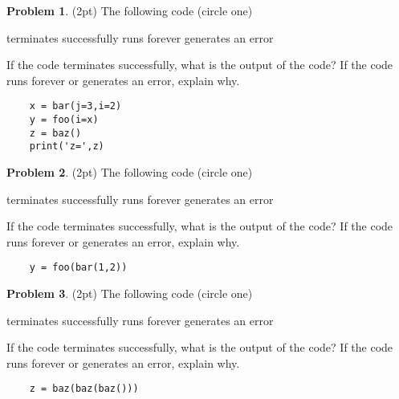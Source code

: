 \documentclass[10pt]{article}
\theoremstyle{definition}
\newtheorem{problem}{Problem}
\begin{document}
\begin{problem}
    (2pt)
    The following code (circle one)
    
    \vspace{0.25in}
    \hspace{0.5in}terminates successfully
    \hspace{1in}runs forever
    \hspace{1in}generates an error
    \vspace{0.25in}

    \noindent
    If the code terminates successfully, what is the output of the code?
    If the code runs forever or generates an error, explain why.
\end{problem}
\begin{lstlisting}
    x = bar(j=3,i=2)
    y = foo(i=x)
    z = baz()
    print('z=',z)
\end{lstlisting}
\vspace{2in}
\newpage
\begin{problem}
    (2pt)
    The following code (circle one)
    
    \vspace{0.25in}
    \hspace{0.5in}terminates successfully
    \hspace{1in}runs forever
    \hspace{1in}generates an error
    \vspace{0.25in}

    \noindent
    If the code terminates successfully, what is the output of the code?
    If the code runs forever or generates an error, explain why.
\end{problem}
\begin{lstlisting}
    y = foo(bar(1,2))
\end{lstlisting}
\vspace{2.5in}

\begin{problem}
    (2pt)
    The following code (circle one)
    
    \vspace{0.25in}
    \hspace{0.5in}terminates successfully
    \hspace{1in}runs forever
    \hspace{1in}generates an error
    \vspace{0.25in}

    \noindent
    If the code terminates successfully, what is the output of the code?
    If the code runs forever or generates an error, explain why.
\end{problem}
\begin{lstlisting}
    z = baz(baz(baz()))
\end{lstlisting}
\vspace{1.5in}
\end{document}
